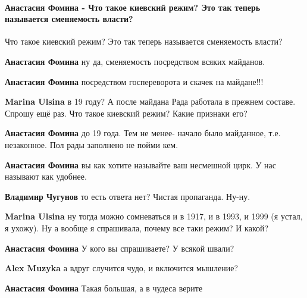  
 
 
 
 
\paragraph{Анастасия Фомина - Что такое киевский режим? Это так теперь называется сменяемость власти?}

\begin{itemize} %
Что такое киевский режим? Это так теперь называется сменяемость власти?

\begin{itemize} %
\textbf{Анастасия Фомина} ну да, сменяемость посредством всяких майданов.

\textbf{Анастасия Фомина} посредством госпереворота и скачек на майдане!!!

\textbf{Marina Ulsina} в 19 году? А после майдана Рада работала в прежнем составе.
Спрошу ещё раз. Что такое киевский режим? Какие признаки его?

\textbf{Анастасия Фомина} до 19 года. Тем не менее- начало было майданное, т.е. незаконное. Пол рады заполнено не пойми кем.

\textbf{Анастасия Фомина} вы как хотите называйте ваш несмешной цирк. У нас называют как удобнее.

\textbf{Владимир Чугунов} то есть ответа нет? Чистая пропаганда. Ну-ну.

\textbf{Marina Ulsina} ну тогда можно сомневаться и в 1917, и в 1993, и 1999 (я устал, я ухожу). Ну а вообще я спрашивала, почему все таки режим? И какой?

\textbf{Анастасия Фомина} У кого вы спрашиваете? У всякой швали?

\textbf{Alex Muzyka} а вдруг случится чудо, и включится мышление?

\textbf{Анастасия Фомина} Такая большая, а в чудеса верите


\end{itemize}
\end{itemize}
